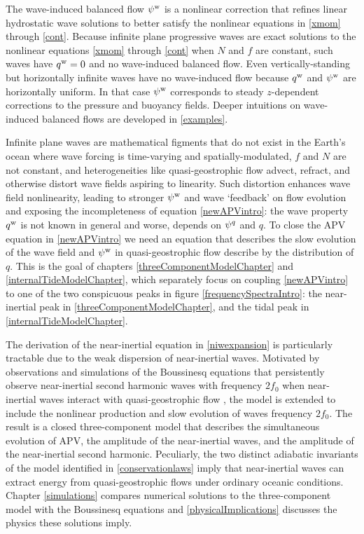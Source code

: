 \documentclass[12pt, oneside]{book}
\begin{document}
The wave-induced balanced flow $\psi^{\mathrm{w}}$ is a nonlinear correction that refines linear hydrostatic wave solutions to better satisfy the nonlinear equations in \eqref{xmom} through \eqref{cont}.  Because infinite plane progressive waves are exact solutions to the nonlinear equations \eqref{xmom} through \eqref{cont} when $N$ and $f$ are constant, such waves have $q^{\mathrm{w}}=0$ and no wave-induced balanced flow.  Even vertically-standing but horizontally infinite waves have no wave-induced flow because $q^{\mathrm{w}}$ and $\psi^{\mathrm{w}}$ are horizontally uniform.  In that case $\psi^{\mathrm{w}}$ corresponds to steady $z$-dependent corrections to the pressure and buoyancy fields.  Deeper intuitions on wave-induced balanced flows are developed in \ch \ref{examples}.

Infinite plane waves are mathematical figments that do not exist in the Earth's ocean where wave forcing is time-varying and spatially-modulated, $f$ and $N$ are not constant, and heterogeneities like quasi-geostrophic flow advect, refract, and otherwise distort wave fields aspiring to linearity.  Such distortion enhances wave field nonlinearity, leading to stronger $\psi^{\mathrm{w}}$ and wave `feedback' on flow evolution and exposing the incompleteness of equation \eqref{newAPVintro}: the wave property $q^{\mathrm{w}}$ is not known in general and worse, depends on $\psi^q$ and $q$.  To close the APV equation in \eqref{newAPVintro} we need an equation that describes the slow evolution of the wave field and $\psi^{\mathrm{w}}$ in quasi-geostrophic flow describe by the distribution of $q$.  This is the goal of chapters \ref{threeComponentModelChapter} and \ref{internalTideModelChapter}, which separately focus on coupling \eqref{newAPVintro} to one of the two conspicuous peaks in figure \ref{frequencySpectraIntro}: the near-inertial peak in \ch \ref{threeComponentModelChapter}, and the tidal peak in \ch \ref{internalTideModelChapter}.  

The derivation of the near-inertial equation in \ch \ref{niwexpansion} is particularly tractable due to the weak dispersion of near-inertial waves.  Motivated by observations and simulations of the Boussinesq equations that persistently observe near-inertial second harmonic waves with frequency $2f_0$ when near-inertial waves interact with quasi-geostrophic flow \citep{DAsaro1995,niwa1999response,danioux2008propagation}, the model is extended to include the nonlinear production and slow evolution of waves frequency $2f_0$.  The result is a closed three-component model that describes the simultaneous evolution of APV, the amplitude of the near-inertial waves, and the amplitude of the near-inertial second harmonic.  Peculiarly, the two distinct adiabatic invariants of the model identified in \ch \ref{conservationlaws} imply that near-inertial waves can extract energy from quasi-geostrophic flows under ordinary oceanic conditions.  Chapter \ref{simulations} compares numerical solutions to the three-component model with the Boussinesq equations and \ch \ref{physicalImplications} discusses the physics these solutions imply.  
\end{document}
